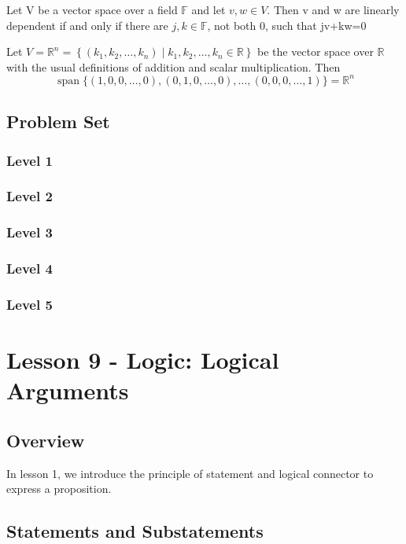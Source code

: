 \documentclass{article}
\begin{document}
\begin{theorem}
    Let V be a vector space over a field $\mathbb{F}$ and let $v,w \in V$. Then
    v and w are linearly dependent if and only if there are $j,k \in \mathbb{F}$,
    not both 0, such that jv+kw=0
\end{theorem}

\begin{theorem}
    Let $V=\mathbb{R}^{n}=\left\{\left(k_{1}, k_{2}, \ldots, k_{n}\right) \mid k_{1}, k_{2}, \ldots, k_{n} \in \mathbb{R}\right\}$ be the vector space over $\mathbb{R}$ with the
    usual definitions of addition and scalar multiplication. Then
    $$
    \operatorname{span}\{(1,0,0, \ldots, 0),(0,1,0, \ldots, 0), \ldots,(0,0,0, \ldots, 1)\}=\mathbb{R}^{n}
    $$
\end{theorem}
\subsection{Problem Set}
\subsubsection{Level 1}
\subsubsection{Level 2}
\subsubsection{Level 3}
\subsubsection{Level 4}
\subsubsection{Level 5}
\pagebreak

\section{Lesson 9 - Logic: Logical Arguments}
\subsection{Overview}

In lesson 1, we introduce the principle of statement and logical
connector to express a proposition.

\subsection{Statements and Substatements}
\end{document}

